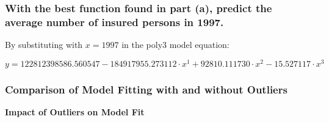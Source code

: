 \documentclass[12pt]{article}
\begin{document}
\subsubsection*{With the best function found in part (a), predict the average number of insured
persons in 1997.}

By substituting with \( x = 1997 \) in the poly3 model equation:

\[
y = 122812398586.560547 - 184917955.273112 \cdot x^1 + 92810.111730 \cdot x^2 - 15.527117 \cdot x^3
\]


\subsubsection*{Comparison of Model Fitting with and without Outliers}
\textbf{Impact of Outliers on Model Fit}
\end{document}
